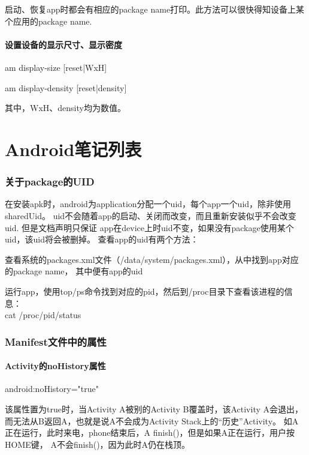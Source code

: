 ﻿\documentclass[a4paper,11pt]{article}
\begin{document}
  启动、恢复app时都会有相应的package name打印。此方法可以很快得知设备上某个应用的package name.

  \subsection[设置设备的显示尺寸、显示密度]{设置设备的显示尺寸、显示密度}
  am display-size [reset|WxH]

  am display-density [reset|density]

  其中，WxH、density均为数值。

  \part[Android Notes List]{Android笔记列表}
  \section[关于package的UID]{关于package的UID}
  在安装apk时，android为application分配一个uid，每个app一个uid，除非使用sharedUid。
	uid不会随着app的启动、关闭而改变，而且重新安装似乎不会改变uid. 但是文档声明只保证
	app在device上时uid不变，如果没有package使用某个uid，该uid将会被删掉。
	查看app的uid有两个方法：
  \begin{coloredenumerate}
    \item 查看系统的packages.xml文件（/data/system/packages.xml），从中找到app对应的package name，
		      其中便有app的uid
    \item 运行app，使用top/ps命令找到对应的pid，然后到/proc目录下查看该进程的信息：\\
      		cat /proc/\lt pid\gt/status
  \end{coloredenumerate}


  \section[Manifest文件中的属性]{Manifest文件中的属性}
  \subsection[Activity的noHistory属性]{Activity的noHistory属性}
  android:noHistory="true"

  该属性置为true时，当Activity A被别的Activity B覆盖时，该Activity A会退出，
  而无法从B返回A，也就是说A不会成为Activity Stack上的“历史”Activity。
  如A正在运行，此时来电，phone结束后，A finish()，但是如果A正在运行，用户按HOME键，
  A不会finish()，因为此时A仍在栈顶。
\end{document}
